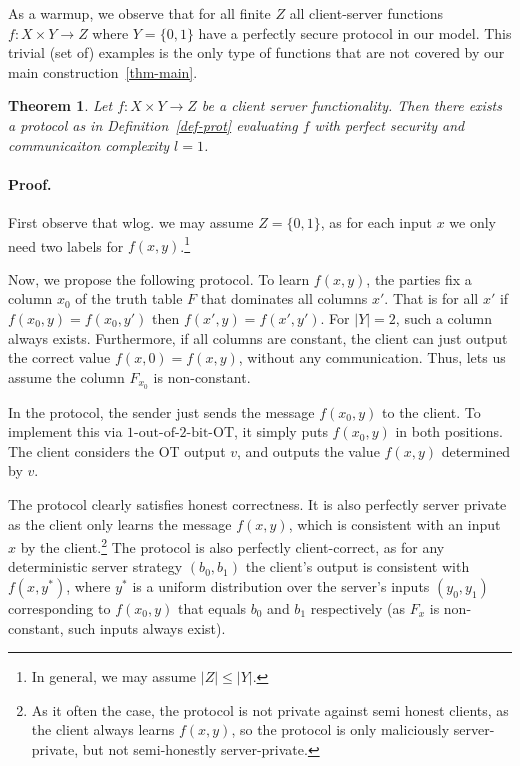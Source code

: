\documentclass[a4paper]{article}
\newtheorem{theorem}{Theorem}[section]
\newcommand{\OT}[2]{#1\text{-out-of-}#2\text{-bit-OT}}
\begin{document}
As a warmup, we observe that for all finite $Z$
all client-server functions $f:X\times Y\rightarrow Z$ where $Y=\{0,1\}$
have a perfectly secure protocol in our model. This trivial (set of) examples is the only type of functions that are not covered by our main construction~\ref{thm-main}.

\begin{theorem}
	Let $f:X\times Y\rightarrow Z$ be a client server functionality. Then there exists a protocol as in Definition~\ref{def-prot} evaluating $f$ with perfect security and communicaiton complexity $l=1$.
\end{theorem}

\paragraph{Proof.}

First observe that wlog. we may assume $Z=\{0,1\}$, as for each input $x$ we only need two labels for $f(x,y)$.\footnote{In general, we may assume $|Z|\leq |Y|$.}

Now, we propose the following protocol.
To learn $f(x,y)$, the parties fix a column $x_0$ of the truth table $F$ that dominates all columns $x'$. That is for all $x'$ if $f(x_0,y)=f(x_0,y')$ then $f(x',y)=f(x',y')$. For $|Y|=2$, such a column always exists.
Furthermore, if all columns are constant, the client can just output the correct value $f(x,0)=f(x,y)$, without any communication.
Thus, lets us assume the column $F_{x_0}$ is non-constant.

In the protocol, the sender just sends the message $f(x_0,y)$ to the client. To implement this via $\OT{1}{2}$, it simply puts $f(x_0,y)$ in both positions.
The client considers the OT output $v$, and outputs the value $f(x,y)$ determined by $v$.

The protocol clearly satisfies honest correctness.
It is also perfectly server private as the client only learns the message $f(x,y)$, which is consistent with an input $x$ by the client.\footnote{As it often the case, the protocol is not private against semi honest clients, as the client always learns $f(x,y)$, so the protocol is only maliciously server-private, but not semi-honestly server-private.} The protocol is also perfectly client-correct, as for any deterministic server strategy $(b_0,b_1)$ the client's output is consistent with $f(x,y^*)$, where $y^*$ is a uniform distribution over the server's inputs $(y_0,y_1)$ corresponding to $f(x_0,y)$ that equals $b_0$ and $b_1$ respectively (as $F_x$ is non-constant, such inputs always exist).
\end{document}
